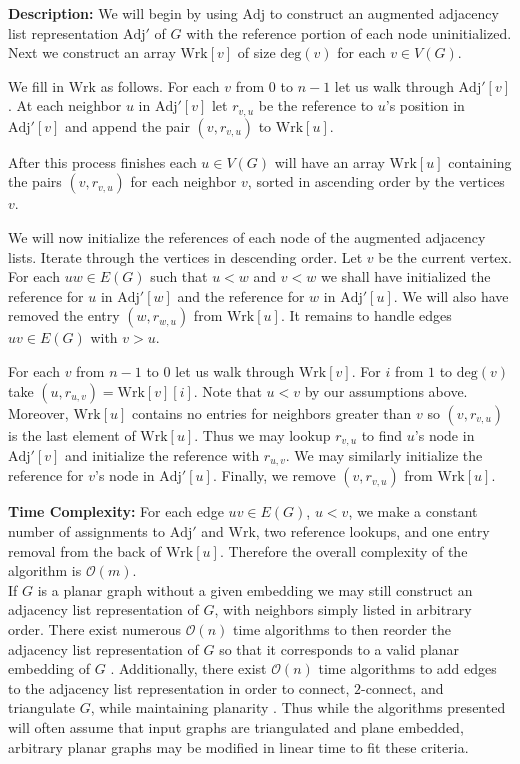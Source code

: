 \documentclass[letterpaper, 12pt]{article}
\theoremstyle{thm}
\begin{document}
\noindent\textbf{Description:} We will begin by using $\text{Adj}$ to construct
an augmented adjacency list representation $\text{Adj}'$ of $G$ with the
reference portion of each node uninitialized.
Next we construct an array $\text{Wrk}[v]$ of size $\text{deg}(v)$ for each
$v\in V(G)$.

We fill in $\text{Wrk}$ as follows. For each $v$ from $0$ to $n-1$ let us walk
through $\text{Adj}'[v]$. At each neighbor $u$ in $\text{Adj}'[v]$ let
$r_{v,u}$ be the reference to $u$'s position in $\text{Adj}'[v]$ and append the
pair $(v,r_{v,u})$ to $\text{Wrk}[u]$.

After this process finishes each $u\in V(G)$ will have an array $\text{Wrk}[u]$
containing the pairs $(v,r_{v,u})$ for each neighbor $v$, sorted in ascending
order by the vertices $v$.

We will now initialize the references of each node of
the augmented adjacency lists.
Iterate through the vertices in descending order. Let $v$ be the current
vertex. For each 
$uw\in E(G)$ such that $u<w$ and $v<w$ we shall have initialized the reference
for $u$ in $\text{Adj}'[w]$ and the reference for $w$ in $\text{Adj}'[u]$. We
will also have removed the entry $(w,r_{w,u})$ from $\text{Wrk}[u]$. It remains
to handle edges $uv\in E(G)$ with $v>u$.

For each $v$ from $n-1$ to $0$ let us walk through $\text{Wrk}[v]$. For $i$ from
$1$ to $\text{deg}(v)$ take $(u,r_{u,v})=\text{Wrk}[v][i]$. Note that $u<v$ by our
assumptions above. Moreover, $\text{Wrk}[u]$ contains no entries for neighbors
greater than $v$ so $(v,r_{v,u})$ is the last element of $\text{Wrk}[u]$. Thus
we may lookup $r_{v,u}$ to find $u$'s node in $\text{Adj}'[v]$ and initialize
the reference with $r_{u,v}$. We may similarly initialize the reference for
$v$'s node in $\text{Adj}'[u]$. Finally, we remove $(v,r_{v,u})$ from
$\text{Wrk}[u]$.

\noindent\textbf{Time Complexity:} For each edge $uv\in E(G)$, $u<v$, we make a
constant number of assignments to $\text{Adj}'$ and $\text{Wrk}$, two reference
lookups, and one entry removal from the back of $\text{Wrk}[u]$.
Therefore the overall complexity of the algorithm is $\mathcal{O}(m)$.\\

If $G$ is a planar graph without a given embedding we may still construct an
adjacency list representation of $G$, with neighbors simply listed in arbitrary
order. There exist numerous $\mathcal{O}(n)$ time algorithms to then reorder the
adjacency list representation of $G$ so that it corresponds to a valid planar
embedding of $G$ \cite{tarjan, lempel, boyer,
booth}. Additionally, there exist $\mathcal{O}(n)$ time algorithms to add edges
to the adjacency list representation in order to connect, $2$-connect, and
triangulate $G$, while maintaining planarity \cite{hagerup,reed,eswaran}.
Thus while the algorithms presented will often assume that input graphs are
triangulated and plane embedded, arbitrary planar graphs may be modified in
linear time to fit these criteria.
\end{document}
